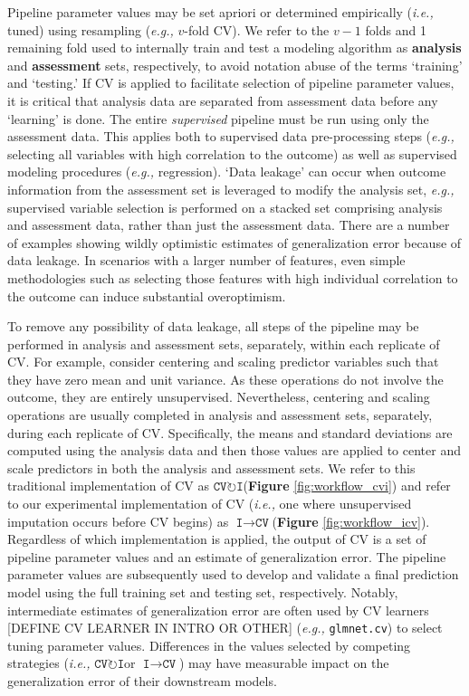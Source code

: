\documentclass[AMA,STIX1COL,doublespace]{WileyNJD-v2}
\begin{document}
Pipeline parameter values may be set apriori or determined empirically
(\textit{i.e., }tuned) using resampling (\textit{e.g., }\(v\)-fold CV).
We refer to the \(v-1\) folds and 1 remaining fold used to internally
train and test a modeling algorithm as \textbf{analysis} and
\textbf{assessment} sets, respectively, to avoid notation abuse of the
terms `training' and `testing.' If CV is applied to facilitate selection
of pipeline parameter values, it is critical that analysis data are
separated from assessment data before any `learning' is done. The entire
\emph{supervised} pipeline must be run using only the assessment data.
This applies both to supervised data pre-processing steps
(\textit{e.g., }selecting all variables with high correlation to the
outcome) as well as supervised modeling procedures
(\textit{e.g., }regression). `Data leakage' can occur when outcome
information from the assessment set is leveraged to modify the analysis
set, \textit{e.g., }supervised variable selection is performed on a
stacked set comprising analysis and assessment data, rather than just
the assessment data.\cite{hastie2009elements} There are a number of
examples showing wildly optimistic estimates of generalization error
because of data leakage.\cite{neunhoeffer2019cross} In scenarios with a
larger number of features, even simple methodologies such as selecting
those features with high individual correlation to the outcome can
induce substantial overoptimism.

To remove any possibility of data leakage, all steps of the pipeline may
be performed in analysis and assessment sets, separately, within each
replicate of CV. For example, consider centering and scaling predictor
variables such that they have zero mean and unit variance. As these
operations do not involve the outcome, they are entirely unsupervised.
Nevertheless, centering and scaling operations are usually completed in
analysis and assessment sets, separately, during each replicate of CV.
Specifically, the means and standard deviations are computed using the
analysis data and then those values are applied to center and scale
predictors in both the analysis and assessment sets. We refer to this
traditional implementation of CV as
$\texttt{CV}\!\circlearrowright\!\texttt{I}$\space (\textbf{Figure}
\ref{fig:workflow_cvi}) and refer to our experimental implementation of
CV (\textit{i.e., }one where unsupervised imputation occurs before CV
begins) as
$\texttt{I}\!\!\rightarrow\!\texttt{CV}$\space (\textbf{Figure}
\ref{fig:workflow_icv}). Regardless of which implementation is applied,
the output of CV is a set of pipeline parameter values and an estimate
of generalization error. The pipeline parameter values are subsequently
used to develop and validate a final prediction model using the full
training set and testing set, respectively. Notably, intermediate
estimates of generalization error are often used by CV learners
{[}DEFINE CV LEARNER IN INTRO OR OTHER{]}
(\textit{e.g., }\texttt{glmnet.cv}) to select tuning parameter values.
Differences in the values selected by competing strategies
(\textit{i.e., }$\texttt{CV}\!\circlearrowright\!\texttt{I}$\space or
$\texttt{I}\!\!\rightarrow\!\texttt{CV}$) may have measurable impact on
the generalization error of their downstream models.
\end{document}
